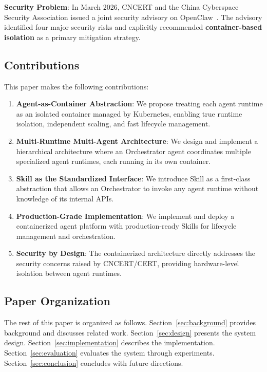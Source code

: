 \textbf{Security Problem}: In March 2026, CNCERT and the China Cyberspace Security Association issued a joint security advisory on OpenClaw~\citep{cncert2026openclaw}. The advisory identified four major security risks and explicitly recommended \textbf{container-based isolation} as a primary mitigation strategy.

\subsection{Contributions}
This paper makes the following contributions:

\begin{enumerate}
    \item \textbf{Agent-as-Container Abstraction}: We propose treating each agent runtime as an isolated container managed by Kubernetes, enabling true runtime isolation, independent scaling, and fast lifecycle management.
    
    \item \textbf{Multi-Runtime Multi-Agent Architecture}: We design and implement a hierarchical architecture where an Orchestrator agent coordinates multiple specialized agent runtimes, each running in its own container.
    
    \item \textbf{Skill as the Standardized Interface}: We introduce Skill as a first-class abstraction that allows an Orchestrator to invoke any agent runtime without knowledge of its internal APIs.
    
    \item \textbf{Production-Grade Implementation}: We implement and deploy a containerized agent platform with production-ready Skills for lifecycle management and orchestration.
    
    \item \textbf{Security by Design}: The containerized architecture directly addresses the security concerns raised by CNCERT/CERT, providing hardware-level isolation between agent runtimes.
\end{enumerate}

\subsection{Paper Organization}
The rest of this paper is organized as follows. Section~\ref{sec:background} provides background and discusses related work. Section~\ref{sec:design} presents the system design. Section~\ref{sec:implementation} describes the implementation. Section~\ref{sec:evaluation} evaluates the system through experiments. Section~\ref{sec:conclusion} concludes with future directions.
